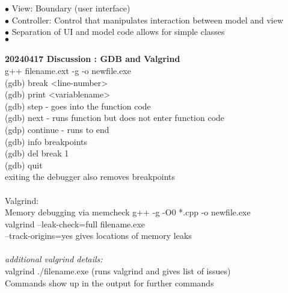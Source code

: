 \documentclass[11pt]{article}
\begin{document}
    \indent\indent $\bullet$ View: Boundary (user interface)\\
    \indent\indent $\bullet$ Controller: Control that manipulates interaction between model and view\\
    \indent\indent $\bullet$ Separation of UI and model code allows for simple classes \\
    \indent $\bullet$ 
    \\ \\
    \textbf{20240417 Discussion : GDB and Valgrind}\\
    g++ filename.ext -g -o newfile.exe\\
    (gdb) break <line-number>\\
    (gdb) print <variablename>\\
    (gdb) step - goes into the function code\\
    (gdb) next - runs function but does not enter function code\\
    (gdp) continue - runs to end\\
    (gdb) info breakpoints\\
    (gdb) del break 1\\
    (gdb) quit\\
    exiting the debugger also removes breakpoints\\
\\
Valgrind:\\
Memory debugging via memcheck
g++ -g -O0 *.cpp -o newfile.exe\\
valgrind --leak-check=full filename.exe\\
--track-origins=yes gives locations of memory leaks\\
\\
\textit{additional valgrind details:}\\
valgrind ./filename.exe (runs valgrind and gives list of issues)\\
Commands show up in the output for further commands\\



    
\end{document}
